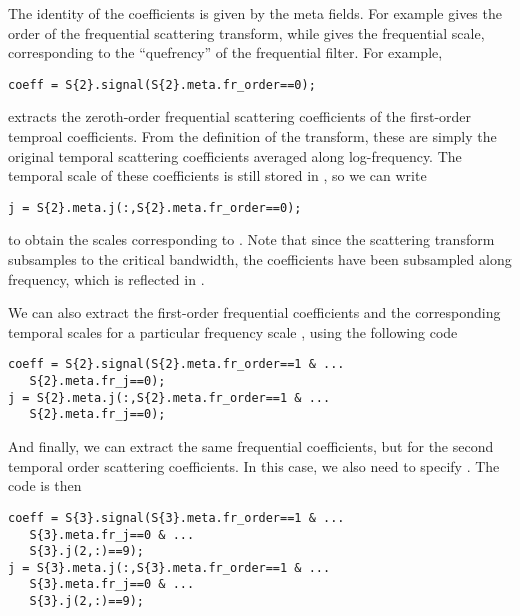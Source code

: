 \documentclass{article}
\begin{document}
The identity of the coefficients is given by the meta fields. For example  gives the order of the frequential scattering transform, while  gives the frequential scale, corresponding to the ``quefrency'' of the frequential filter. For example,
\begin{lstlisting}
coeff = S{2}.signal(S{2}.meta.fr_order==0);
\end{lstlisting}
extracts the zeroth-order frequential scattering coefficients of the first-order temproal coefficients. From the definition of the transform, these are simply the original temporal scattering coefficients averaged along log-frequency. The temporal scale of these coefficients is still stored in , so we can write
\begin{lstlisting}
j = S{2}.meta.j(:,S{2}.meta.fr_order==0);
\end{lstlisting}
to obtain the scales  corresponding to . Note that since the scattering transform subsamples to the critical  bandwidth, the coefficients have been subsampled along frequency, which is reflected in .

We can also extract the first-order frequential coefficients and the corresponding temporal scales  for a particular frequency scale , using the following code
\begin{lstlisting}
coeff = S{2}.signal(S{2}.meta.fr_order==1 & ...
   S{2}.meta.fr_j==0);
j = S{2}.meta.j(:,S{2}.meta.fr_order==1 & ...
   S{2}.meta.fr_j==0);
\end{lstlisting}
And finally, we can extract the same frequential coefficients, but for the second temporal order scattering coefficients. In this case, we also need to specify . The code is then
\begin{lstlisting}
coeff = S{3}.signal(S{3}.meta.fr_order==1 & ...
   S{3}.meta.fr_j==0 & ...
   S{3}.j(2,:)==9);
j = S{3}.meta.j(:,S{3}.meta.fr_order==1 & ...
   S{3}.meta.fr_j==0 & ...
   S{3}.j(2,:)==9);
\end{lstlisting}
\end{document}
